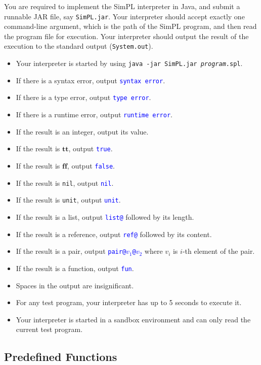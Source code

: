 \documentclass{article}
\newcommand{\btt}{\mathbf{tt}}
\newcommand{\bff}{\mathbf{ff}}
\newcommand{\result}[1]{\textcolor{blue}{\texttt{#1}}}
\begin{document}
You are required to implement the SimPL interpreter in Java, and submit a runnable JAR file, say \texttt{SimPL.jar}.  Your interpreter should accept exactly one command-line argument, which is the path of the SimPL program, and then read the program file for execution.  Your interpreter should output the result of the execution to the standard output (\texttt{System.out}).
\begin{itemize}
  \item Your interpreter is started by using \texttt{java -jar SimPL.jar \emph{program}.spl}.
  \item If there is a syntax error, output \result{syntax error}.
  \item If there is a type error, output \result{type error}.
  \item If there is a runtime error, output \result{runtime error}.
  \item If the result is an integer, output its value.
  \item If the result is $\btt$, output \result{true}.
  \item If the result is $\bff$, output \result{false}.
  \item If the result is \texttt{nil}, output \result{nil}.
  \item If the result is \texttt{unit}, output \result{unit}.
  \item If the result is a list, output \result{list@} followed by its length.
  \item If the result is a reference, output \result{ref@} followed by its content.
  \item If the result is a pair, output \result{pair@$v_1$@$v_2$} where $v_i$ is $i$-th element of the pair.
  \item If the result is a function, output \result{fun}.
  \item Spaces in the output are insignificant.
  \item For any test program, your interpreter has up to 5 seconds to execute it.
  \item Your interpreter is started in a sandbox environment and can only read the current test program.
\end{itemize}

\subsection{Predefined Functions}
\end{document}
